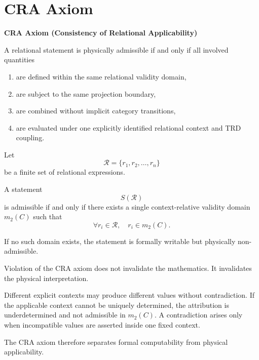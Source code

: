 \section{CRA Axiom}

\textbf{CRA Axiom (Consistency of Relational Applicability)}

A relational statement is physically admissible if and only if
all involved quantities

\begin{enumerate}
    \item are defined within the same relational validity domain,
    \item are subject to the same projection boundary,
    \item are combined without implicit category transitions,
    \item are evaluated under one explicitly identified relational context
    and TRD coupling.
\end{enumerate}

Let
\[
\mathcal{R} = \{ r_1, r_2, \dots, r_n \}
\]
be a finite set of relational expressions.

A statement
\[
S(\mathcal{R})
\]
is admissible if and only if there exists a single context-relative
validity domain \( m_2(C) \)
such that
\[
\forall r_i \in \mathcal{R}, \quad r_i \in m_2(C).
\]

If no such domain exists, the statement is formally writable
but physically non-admissible.

Violation of the CRA axiom does not invalidate the mathematics.
It invalidates the physical interpretation.

Different explicit contexts may produce different values without contradiction.
If the applicable context cannot be uniquely determined, the attribution is
underdetermined and not admissible in $m_2(C)$. A contradiction arises only
when incompatible values are asserted inside one fixed context.

The CRA axiom therefore separates
formal computability
from physical applicability.
